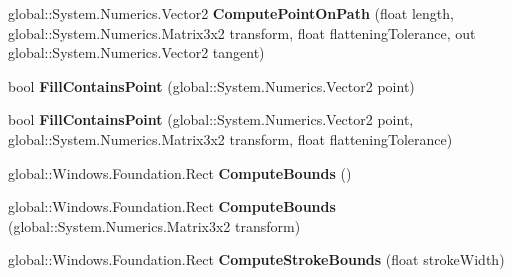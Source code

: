 \begin{DoxyCompactItemize}
\mbox{\label{class_microsoft_1_1_graphics_1_1_canvas_1_1_geometry_1_1_canvas_geometry_a6bc7857a0a83e9f54a5231413995be25}} 
global\+::\+System.\+Numerics.\+Vector2 {\bfseries Compute\+Point\+On\+Path} (float length, global\+::\+System.\+Numerics.\+Matrix3x2 transform, float flattening\+Tolerance, out global\+::\+System.\+Numerics.\+Vector2 tangent)
\item 
\mbox{\label{class_microsoft_1_1_graphics_1_1_canvas_1_1_geometry_1_1_canvas_geometry_a33d42974c81157630960db493eedc046}} 
bool {\bfseries Fill\+Contains\+Point} (global\+::\+System.\+Numerics.\+Vector2 point)
\item 
\mbox{\label{class_microsoft_1_1_graphics_1_1_canvas_1_1_geometry_1_1_canvas_geometry_a5952326043566da1708fc1be2b2677c0}} 
bool {\bfseries Fill\+Contains\+Point} (global\+::\+System.\+Numerics.\+Vector2 point, global\+::\+System.\+Numerics.\+Matrix3x2 transform, float flattening\+Tolerance)
\item 
\mbox{\label{class_microsoft_1_1_graphics_1_1_canvas_1_1_geometry_1_1_canvas_geometry_abdbf95c37d4fceb533f79fc841fb2226}} 
global\+::\+Windows.\+Foundation.\+Rect {\bfseries Compute\+Bounds} ()
\item 
\mbox{\label{class_microsoft_1_1_graphics_1_1_canvas_1_1_geometry_1_1_canvas_geometry_a5764fbff119976df677cb8f61c790158}} 
global\+::\+Windows.\+Foundation.\+Rect {\bfseries Compute\+Bounds} (global\+::\+System.\+Numerics.\+Matrix3x2 transform)
\item 
\mbox{\label{class_microsoft_1_1_graphics_1_1_canvas_1_1_geometry_1_1_canvas_geometry_ae0b4d41a78ebb80d02c862619a7d69cd}} 
global\+::\+Windows.\+Foundation.\+Rect {\bfseries Compute\+Stroke\+Bounds} (float stroke\+Width)
\item 
\mbox{\label{class_microsoft_1_1_graphics_1_1_canvas_1_1_geometry_1_1_canvas_geometry_a1944cea013afac73147a5ab67b3adf46}} 

\end{DoxyCompactItemize}
